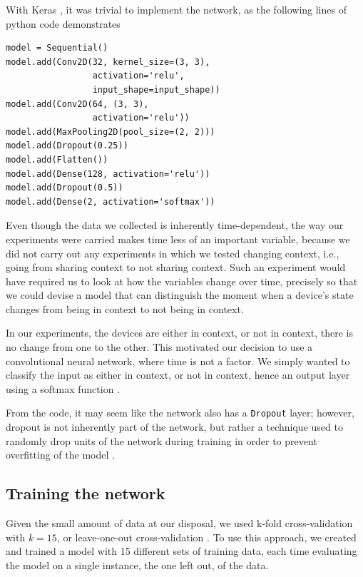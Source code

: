 \documentclass[journal]{IEEEtranTIE}
\begin{document}
\begin{enumerate}
\begin{enumerate}
With Keras \cite{Keras}, it was trivial to implement the network, as the
following lines of python code demonstrates

\begin{lstlisting}
model = Sequential()
model.add(Conv2D(32, kernel_size=(3, 3),
                 activation='relu',
                 input_shape=input_shape))
model.add(Conv2D(64, (3, 3),
                 activation='relu'))
model.add(MaxPooling2D(pool_size=(2, 2)))
model.add(Dropout(0.25))
model.add(Flatten())
model.add(Dense(128, activation='relu'))
model.add(Dropout(0.5))
model.add(Dense(2, activation='softmax'))
\end{lstlisting}

Even though the data we collected is inherently time-dependent, the way our
experiments were carried makes time less of an important variable, because we
did not carry out any experiments in which we tested changing context, i.e.,
going from sharing context to not sharing context. Such an experiment would have
required us to look at how the variables change over time, precisely so that we
could devise a model that can distinguish the moment when a device's state
changes from being in context to not being in context.

In our experiments, the devices are either in context, or not in context, there
is no change from one to the other. This motivated our decision to use a
convolutional neural network, where time is not a factor. We simply wanted to
classify the input as either in context, or not in context, hence an output
layer using a softmax function \cite{DeepLearning,LeCunn}.

From the code, it may seem like the network also has a \texttt{Dropout} layer;
however, dropout is not inherently part of the network, but rather a technique
used to randomly drop units of the network during training in order to prevent
overfitting of the model \cite{Dropout}.

\subsection{Training the network}

Given the small amount of data at our disposal, we used k-fold cross-validation
with $k=15$, or leave-one-out cross-validation \cite{StatLearn}. To use this
approach, we created and trained a model with 15 different sets of training
data, each time evaluating the model on a single instance, the one left out, of
the data.


\end{enumerate}
\end{enumerate}
\end{document}
